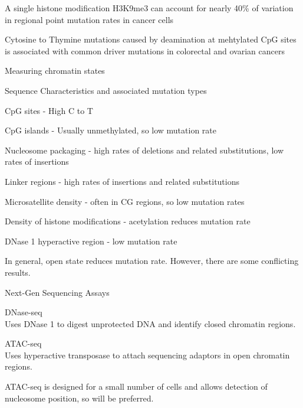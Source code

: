 \begin{outline}
\begin{outline}
\begin{outline}
			\item A single histone modification H3K9me3 can account for nearly 40\% of variation in regional point mutation rates in cancer cells \parencite{schuster-bockler_chromatin_2012}
			\item Cytosine to Thymine mutations caused by deamination at mehtylated CpG sites is associated with common driver mutations in colorectal and ovarian cancers \parencite{gold_somatic_2017}
		\end{outline}
		\item Measuring chromatin states
		\begin{outline}
			\item Sequence Characteristics and associated mutation types \parencite{makova_effects_2015}
			\begin{outline}
				\item CpG sites - High C to T
				\item CpG islands - Usually unmethylated, so low mutation rate
				\item Nucleosome packaging - high rates of deletions and related substitutions, low rates of insertions
				\item Linker regions - high rates of insertions and related substitutions
				\item Microsatellite density - often in CG regions, so low mutation rates
				\item Density of histone modifications - acetylation reduces mutation rate
				\item DNase 1 hyperactive region - low mutation rate
				\item In general, open state reduces mutation rate. However, there are some conflicting results.
			\end{outline}
			\item Next-Gen Sequencing Assays
			\begin{outline}
				\item DNase-seq \parencite{boyle_high-resolution_2008} \\
				Uses DNase 1 to digest unprotected DNA and identify closed chromatin regions.
				\item ATAC-seq \parencite{buenrostro_transposition_2013} \\
				Uses hyperactive transposase to attach sequencing adaptors in open chromatin regions.
				\item ATAC-seq is designed for a small number of cells and allows detection of nucleosome position, so will be preferred.
			\end{outline}

\end{outline}
\end{outline}
\end{outline}
